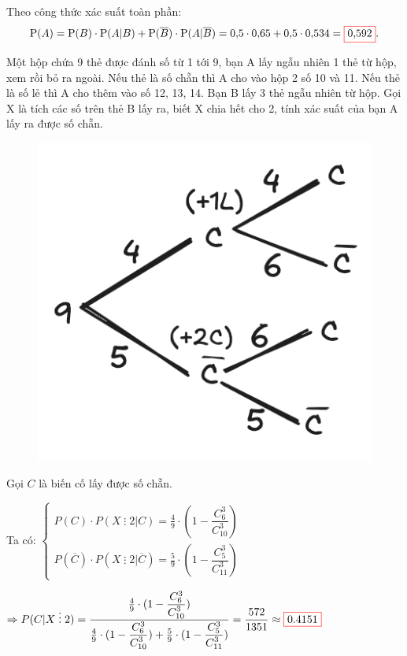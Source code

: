 \documentclass[twoside,final]{hcmut-report}
\newcommand{\exercise}[1]{\begin{exercisebox}#1\end{exercisebox}}
\newcommand{\result}[1]{\fcolorbox{red}{white}{#1}}
\newcommand{\divides}{\mathrel{\vdots}}
\begin{document}
Theo công thức xác suất toàn phần:
\[
    \mathrm{P}(A) = \mathrm{P}(B) \cdot \mathrm{P}(A | B) + \mathrm{P}(\overline{B}) \cdot \mathrm{P}(A | \overline{B})
    = 0{,}5 \cdot 0{,}65 + 0{,}5 \cdot 0{,}534 = \result{0{,}592}.
\]
\exercise{Một hộp chứa 9 thẻ được đánh số từ 1 tới 9, bạn A lấy ngẫu nhiên 1 thẻ từ hộp, xem rồi bỏ ra ngoài. Nếu thẻ là số chẵn thì A cho vào hộp 2 số 10 và 11. Nếu thẻ là số lẻ thì A cho thêm vào số 12, 13, 14. Bạn B lấy 3 thẻ ngẫu nhiên từ hộp. Gọi X là tích các số trên thẻ B lấy ra, biết X chia hết cho 2, tính xác suất của bạn A lấy ra được số chẵn.
}
\begin{figure}
    \centering
    \includegraphics[width=1.2\linewidth]{images/XSTK/2.png}
\end{figure}
Gọi $C$ là biến cố lấy được số chẵn.\par
Ta có:
$\begin{cases}
        P(C)\cdot P(X\divides 2|C) = \frac{4}{9}\cdot(1-\dfrac{C_6^3}{\displaystyle C_{10}^3}) \\
        P(\overline{C})\cdot P(X\divides 2|\overline{C}) = \frac{5}{9}\cdot(1-\dfrac{C_5^3}{\displaystyle C_{11}^3})
    \end{cases}$\par
$\Rightarrow P(C|X\divides 2) = \dfrac{\frac{4}{9}\cdot(1-\dfrac{C_6^3}{\displaystyle C_{10}^3})}{\frac{4}{9}\cdot(1-\dfrac{C_6^3}{\displaystyle C_{10}^3}) + \frac{5}{9}\cdot(1-\dfrac{C_5^3}{\displaystyle C_{11}^3})} =\dfrac{572}{1351}\approx \result{0.4151}$
\end{document}

